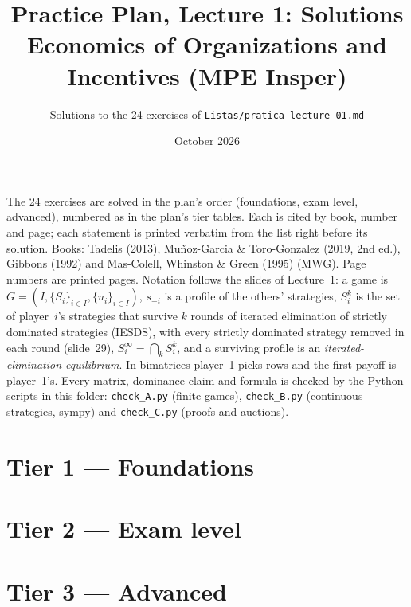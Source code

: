 \documentclass[11pt,a4paper]{article}
\title{\textbf{Practice Plan, Lecture 1: Solutions}\\[4pt]
  \large Economics of Organizations and Incentives (MPE Insper)}
\author{Solutions to the 24 exercises of \texttt{Listas/pratica-lecture-01.md}}
\date{October 2026}
\newcommand{\MG}{Mu\~noz-Garcia}
\newcommand{\sm}{s_{-i}}
\begin{document}
\maketitle
\thispagestyle{empty}

\noindent The 24 exercises are solved in the plan's order (foundations, exam level, advanced),
numbered as in the plan's tier tables. Each is cited by book, number and page; each statement is printed verbatim from the list right before its solution. Books: Tadelis (2013), \MG{} \& Toro-Gonzalez (2019, 2nd ed.),
Gibbons (1992) and Mas-Colell, Whinston \& Green (1995) (MWG). Page numbers are printed pages.
Notation follows the slides of Lecture~1: a game is $G = (I, \{S_i\}_{i\in I}, \{u_i\}_{i\in I})$,
$\sm$ is a profile of the others' strategies, $S_i^k$ is the set of player~$i$'s strategies that
survive $k$ rounds of iterated elimination of strictly dominated strategies (IESDS), with every
strictly dominated strategy removed in each round (slide~29), $S_i^\infty = \bigcap_k S_i^k$, and
a surviving profile is an \emph{iterated-elimination equilibrium}. In bimatrices player~1 picks
rows and the first payoff is player~1's. Every matrix, dominance claim and formula is checked by
the Python scripts in this folder: \texttt{check\_A.py} (finite games), \texttt{check\_B.py}
(continuous strategies, sympy) and \texttt{check\_C.py} (proofs and auctions).

\tableofcontents
\newpage

\part*{Tier 1 --- Foundations}









\part*{Tier 2 --- Exam level}











\part*{Tier 3 --- Advanced}






\end{document}
